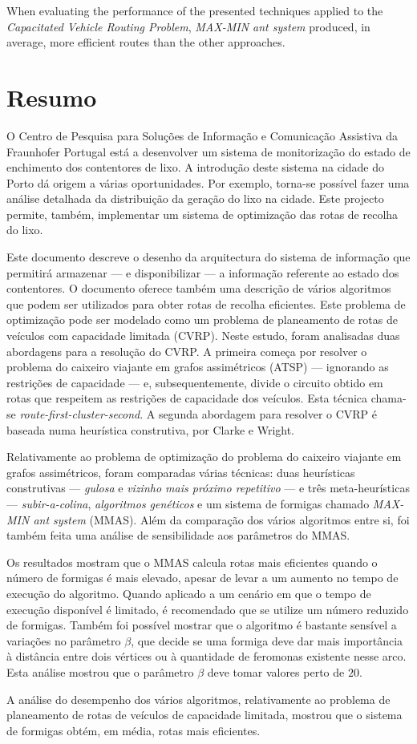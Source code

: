 When evaluating the performance of the presented techniques applied to the
\textit{Capacitated Vehicle Routing Problem}, \textit{MAX-MIN ant system}
produced, in average, more efficient routes than the other approaches. 


\chapter*{Resumo}

O Centro de Pesquisa para Soluções de Informação e Comunicação Assistiva da
Fraunhofer Portugal está a desenvolver um sistema de monitorização do estado de
enchimento dos contentores de lixo. A introdução deste sistema na cidade do
Porto dá origem a várias oportunidades. Por exemplo, torna-se possível fazer uma
análise detalhada da distribuição da geração do lixo na cidade. Este projecto
permite, também, implementar um sistema de optimização das rotas de recolha do
lixo.

Este documento descreve o desenho da arquitectura do sistema de informação que
permitirá armazenar --- e disponibilizar --- a informação referente ao estado
dos contentores. O documento oferece também uma descrição de vários algoritmos
que podem ser utilizados para obter rotas de recolha eficientes. Este problema
de optimização pode ser modelado como um problema de planeamento de rotas de
veículos com capacidade limitada (CVRP).  Neste estudo, foram analisadas duas
abordagens para a resolução do CVRP.  A primeira começa por resolver o problema
do caixeiro viajante em grafos assimétricos (ATSP) --- ignorando as restrições
de capacidade --- e, subsequentemente, divide o circuito obtido em rotas que
respeitem as restrições de capacidade dos veículos. Esta técnica chama-se
\textit{route-first-cluster-second}. A segunda abordagem para resolver o CVRP
é baseada numa heurística construtiva, por Clarke e Wright.

Relativamente ao problema de optimização do problema do caixeiro viajante em
grafos assimétricos, foram comparadas várias técnicas: duas heurísticas
construtivas --- \textit{gulosa} e \textit{vizinho mais próximo repetitivo} ---
e três meta-heurísticas --- \textit{subir-a-colina}, \textit{algoritmos
genéticos} e um sistema de formigas chamado \textit{MAX-MIN ant system} (MMAS).
Além da comparação dos vários algoritmos entre si, foi também feita uma análise
de sensibilidade aos parâmetros do MMAS.

Os resultados mostram que o MMAS calcula rotas mais eficientes quando o número
de formigas é mais elevado, apesar de levar a um aumento no tempo de execução do algoritmo.
Quando aplicado a um cenário em que o tempo de execução disponível é limitado,
é recomendado que se utilize um número reduzido de formigas. Também foi possível
mostrar que o algoritmo é bastante sensível a variações no parâmetro $\beta$,
que decide se uma formiga deve dar mais importância à distância entre dois
vértices ou à quantidade de feromonas existente nesse arco. Esta análise mostrou
que o parâmetro $\beta$ deve tomar valores perto de $20$.

A análise do desempenho dos vários algoritmos, relativamente ao problema de
planeamento de rotas de veículos de capacidade limitada, mostrou que o sistema
de formigas obtém, em média, rotas mais eficientes. 

